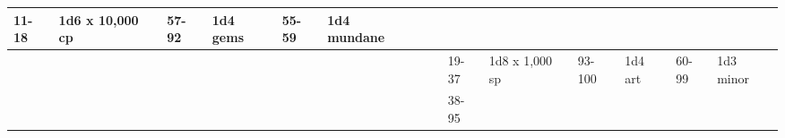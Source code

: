 \begin{longtable}{llllllllllllll}
{\begin{minipage}[t]{0.393in}
11-18\end{minipage}} & \multicolumn{1}{p{0.469in}|}{\begin{minipage}[t]{0.469in}\raggedright
1d6 x 10,000 cp\end{minipage}} & \multicolumn{1}{p{0.923in}|}{\begin{minipage}[t]{0.923in}\raggedright
57-92\end{minipage}} & \multicolumn{1}{p{0.469in}|}{\begin{minipage}[t]{0.469in}\raggedright
1d4 gems\end{minipage}} & \multicolumn{1}{p{0.626in}|}{\begin{minipage}[t]{0.626in}\raggedright
55-59\end{minipage}} & \multicolumn{1}{p{0.469in}|}{\begin{minipage}[t]{0.469in}\centering
1d4 mundane\end{minipage}}\\
\hline
\multicolumn{8}{p{1.150in}|}{\begin{minipage}[t]{1.150in}\centering
\end{minipage}} & \multicolumn{1}{|p{0.393in}|}{\begin{minipage}[t]{0.393in}\raggedright
19-37\end{minipage}} & \multicolumn{1}{p{0.469in}|}{\begin{minipage}[t]{0.469in}\raggedright
1d8 x 1,000 sp\end{minipage}} & \multicolumn{1}{p{0.923in}|}{\begin{minipage}[t]{0.923in}\raggedright
93-100\end{minipage}} & \multicolumn{1}{p{0.469in}|}{\begin{minipage}[t]{0.469in}\raggedright
1d4 art\end{minipage}} & \multicolumn{1}{p{0.626in}|}{\begin{minipage}[t]{0.626in}\raggedright
60-99\end{minipage}} & \multicolumn{1}{p{0.469in}|}{\begin{minipage}[t]{0.469in}\centering
1d3 minor\end{minipage}}\\
\hline
\multicolumn{8}{p{1.150in}|}{\begin{minipage}[t]{1.150in}\centering
\end{minipage}} & \multicolumn{1}{|p{0.393in}|}{\begin{minipage}[t]{0.393in}\raggedright
38-95\end{minipage}} & \multicolumn{1}{p{0.469in}|}{\begin{minipage}[t]{0.469in}\raggedright

\end{minipage}}
\end{longtable}
